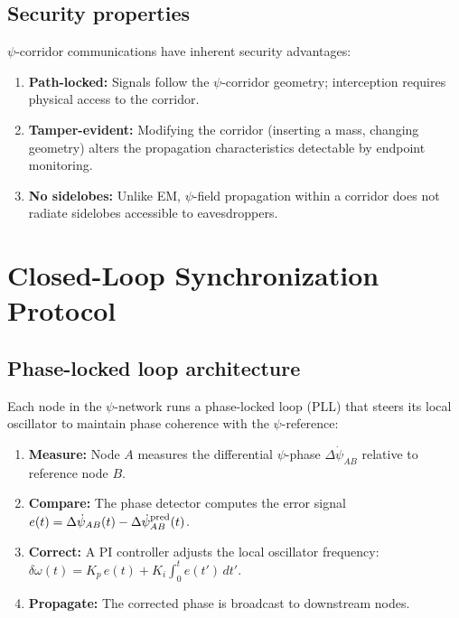 \documentclass[aps,prd,twocolumn,superscriptaddress,nofootinbib]{revtex4-2}
\begin{document}
\subsection{Security properties}\label{sec:comm-security}

$\psi$-corridor communications have inherent security advantages:
\begin{enumerate}
\item \textbf{Path-locked:} Signals follow the $\psi$-corridor
geometry; interception requires physical access to the corridor.
\item \textbf{Tamper-evident:} Modifying the corridor (inserting a
mass, changing geometry) alters the propagation characteristics
detectable by endpoint monitoring.
\item \textbf{No sidelobes:} Unlike EM, $\psi$-field propagation
within a corridor does not radiate sidelobes accessible to
eavesdroppers.
\end{enumerate}

\section{Closed-Loop Synchronization Protocol}\label{sec:sync}

\subsection{Phase-locked loop architecture}\label{sec:PLL}

Each node in the $\psi$-network runs a phase-locked loop (PLL) that
steers its local oscillator to maintain phase coherence with the
$\psi$-reference:

\begin{enumerate}
\item \textbf{Measure:} Node $A$ measures the differential $\psi$-phase
$\Delta\dot{\psi}_{AB}$ relative to reference node $B$.
\item \textbf{Compare:} The phase detector computes the error signal
$e(t) = \Delta\dot{\psi}_{AB}(t) - \Delta\dot{\psi}_{AB}^{\rm pred}(t)$.
\item \textbf{Correct:} A PI controller adjusts the local oscillator
frequency: $\delta\omega(t) = K_p\,e(t) + K_i\int_0^t e(t')\,dt'$.
\item \textbf{Propagate:} The corrected phase is broadcast to
downstream nodes.
\end{enumerate}
\end{document}

